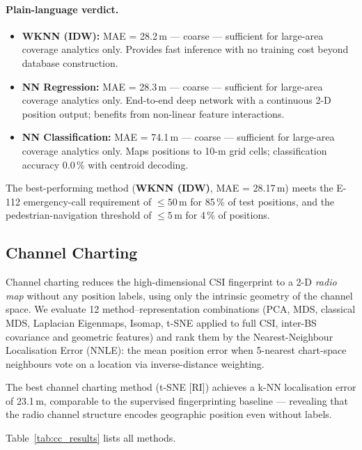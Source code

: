 \paragraph{Plain-language verdict.}
\begin{itemize}
  \item \textbf{WKNN (IDW):} MAE = 28.2\,m — coarse — sufficient for large-area coverage analytics only.
        Provides fast inference with no training cost beyond database construction.
  \item \textbf{NN Regression:} MAE = 28.3\,m — coarse — sufficient for large-area coverage analytics only.
        End-to-end deep network with a continuous 2-D position output; benefits
        from non-linear feature interactions.
  \item \textbf{NN Classification:} MAE = 74.1\,m — coarse — sufficient for large-area coverage analytics only.
        Maps positions to 10-m grid cells; classification accuracy
        0.0\,\% with centroid decoding.
\end{itemize}
The best-performing method (\textbf{WKNN (IDW)}, MAE = 28.17\,m)
meets the E-112 emergency-call requirement of $\leq 50\,\text{m}$ for
85\,\% of test positions, and the pedestrian-navigation
threshold of $\leq 5\,\text{m}$ for 4\,\% of positions.

\subsection{Channel Charting}
\label{sec:cc_results}

Channel charting reduces the high-dimensional CSI fingerprint to a
2-D \emph{radio map} without any position labels, using only the
intrinsic geometry of the channel space.  We evaluate 12
method--representation combinations (PCA, MDS, classical MDS, Laplacian
Eigenmaps, Isomap, t-SNE applied to full CSI, inter-BS covariance and
geometric features) and rank them by the Nearest-Neighbour Localisation
Error (NNLE): the mean position error when 5-nearest chart-space neighbours
vote on a location via inverse-distance weighting.

The best channel charting method (t-SNE [RI]) achieves a k-NN localisation error of 23.1\,m, comparable to the supervised fingerprinting baseline — revealing that the radio channel structure encodes geographic position even without labels.

Table~\ref{tab:cc_results} lists all methods.

